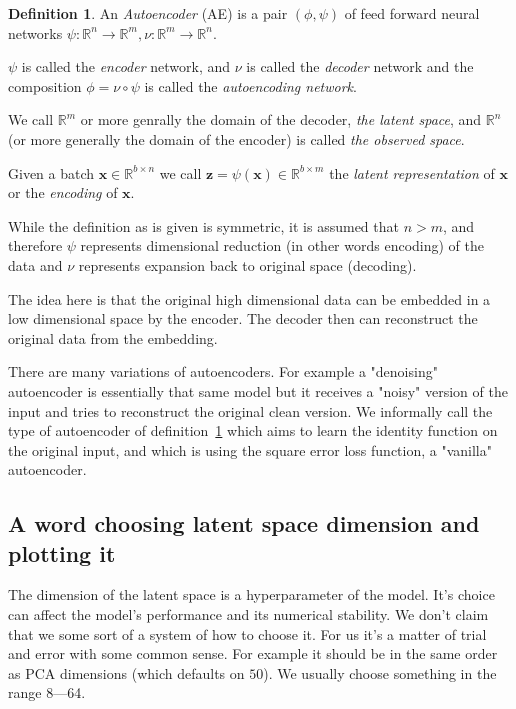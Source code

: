 \documentclass[11pt, a4paper]{report}
\theoremstyle{plain}
\theoremstyle{definition}
\newtheorem{mydef}{Definition}[chapter]
\theoremstyle{remark}
\newcommand{\R}{\mathbb{R}}
\newcommand{\x}{\mathbf{x}}
\newcommand{\z}{\mathbf{z}}
\begin{document}
\begin{mydef}
\label{def:autoencoder}
An \textit{Autoencoder} (AE) is a pair 
$(\phi, \psi)$ of feed forward neural networks 
$\psi : \R^n \to \R^m, \nu : \R^m \to \R^n$.

$\psi$ is called the \emph{encoder} network, and $\nu$ is called the
\emph{decoder} network and the composition
$\phi = \nu \circ \psi$ is called the \emph{autoencoding network}. 

We call $\R^m$ or more genrally the domain of the decoder, \emph{the latent
space}, and $\R^n$ (or more generally the domain of the encoder) is called
\emph{the observed space}.

Given a batch $\x \in \R^{b \times n}$ we call $\z = \psi(\x) \in \R^{b \times m}$
the \emph{latent representation} of $\x$ or the \emph{encoding} of $\x$.
\end{mydef}

While the definition as is given is symmetric, it is assumed that $n > m$, and
therefore $\psi$ represents dimensional reduction (in other words encoding) of
the data and $\nu$ represents expansion back to original space (decoding).

The idea here is that the original high dimensional data can be embedded
in a low dimensional space by the encoder. The decoder then can reconstruct the
original data from the embedding.

There are many variations of autoencoders. For example a "denoising" autoencoder is
essentially that same model but it receives a "noisy" version of the input and
tries to reconstruct the original clean version.
We informally call the type of autoencoder of
definition~\ref{def:autoencoder} which aims to learn the identity function 
on the original input, and which is using the square error loss function, 
a "vanilla" autoencoder. 

\subsection{A word choosing latent space dimension and plotting it}
The dimension of the latent space is a hyperparameter of the model. It's choice
can affect the model's performance and its numerical stability.
We don't claim that we some sort of a system of how to choose it. For us it's a
matter of trial and error with some common sense. For example it should be in
the same order as PCA dimensions (which defaults on $50$). We usually choose
something in the range 8---64.
\end{document}

